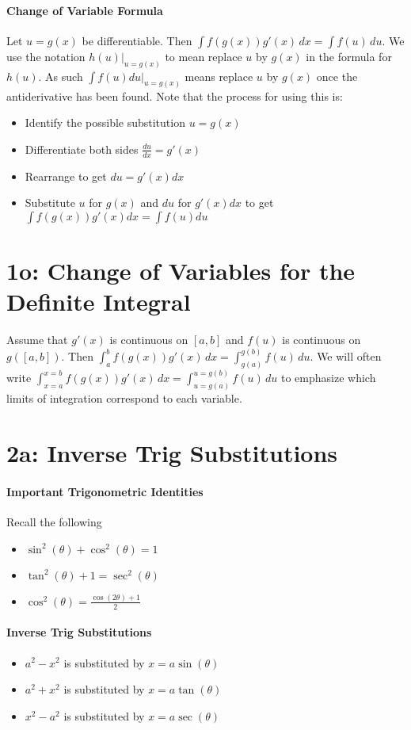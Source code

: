 \documentclass[10pt,letter]{article}
\begin{document}
\paragraph{Change of Variable Formula}
Let $u=g(x)$ be differentiable. Then $\int f(g(x))g'(x)\,dx=\int f(u)\,du$. We use the notation $h(u)|_{u=g(x)}$ to mean replace $u$ by $g(x)$ in the formula for $h(u)$. As such $\int f(u)du|_{u=g(x)}$ means replace $u$ by $g(x)$ once the antiderivative has been found. Note that the process for using this is: \begin{itemize}
    \item Identify the possible substitution $u=g(x)$ 
    \item Differentiate both sides $\frac{du}{dx}=g'(x)$
    \item Rearrange to get $du=g'(x)dx$ 
    \item Substitute $u$ for $g(x)$ and $du$ for $g'(x)dx$ to get $\int f(g(x))g'(x)dx=\int f(u)du$
\end{itemize}


\section*{1o: Change of Variables for the Definite Integral}
Assume that $g'(x)$ is continuous on $[a,b]$ and $f(u)$ is continuous on $g([a,b])$. Then $\int_a^bf(g(x))g'(x)\,dx=\int_{g(a)}^{g(b)}f(u)\,du$. We will often write $\int_{x=a}^{x=b}f(g(x))g'(x)\,dx=\int_{u=g(a)}^{u=g(b)}f(u)\,du$ to emphasize which limits of integration correspond to each variable. 

\section*{2a: Inverse Trig Substitutions}
\paragraph{Important Trigonometric Identities}
Recall the following 
\begin{itemize}
    \item $\sin^2(\theta)+\cos^2(\theta)=1$
    \item $\tan^2(\theta)+1=\sec^2(\theta)$
    \item $\cos^2(\theta)=\frac{\cos(2\theta)+1}{2}$
\end{itemize}

\paragraph{Inverse Trig Substitutions}
\begin{itemize}
    \item $a^2-x^2$ is substituted by $x=a\sin(\theta)$ 
    \item $a^2+x^2$ is substituted by $x=a\tan(\theta)$ 
    \item $x^2-a^2$ is substituted by $x=a\sec(\theta)$
\end{itemize}
\end{document}
